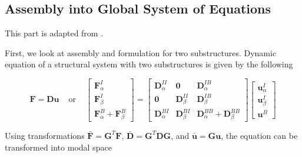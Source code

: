 \documentclass[../DomainDecomposition.tex]{subfiles}
\begin{document}
 

\subsection{Assembly into Global System of Equations} 

This part is adapted from \cite{chatterjee2021multilevel}. 
\vspace{10pt} 

First, we look at assembly and formulation for two substructures. 
Dynamic equation of a structural system with two substructures is given by the following 

\begin{equation}
    \mathbf{F} 
    =
    \mathbf{D} \mathbf{u} 
    \phantom{xx} 
    \text{or} 
    \phantom{xx} 
    \begin{bmatrix}
        \mathbf{F}_{\alpha}^{I} \\ 
        \mathbf{F}_{\beta}^{I} \\ 
        \mathbf{F}_{\alpha}^{B} + 
        \mathbf{F}_{\beta}^{B} 
    \end{bmatrix}
    =
    \begin{bmatrix}
        \mathbf{D}_{\alpha}^{II} & 
        \mathbf{0} & 
        \mathbf{D}_{\alpha}^{IB} \\ 
        \mathbf{0} & 
        \mathbf{D}_{\beta}^{II} & 
        \mathbf{D}_{\beta}^{IB} \\ 
        \mathbf{D}_{\alpha}^{BI} & 
        \mathbf{D}_{\beta}^{BI} & 
        \mathbf{D}_{\alpha}^{BB} + 
        \mathbf{D}_{\beta}^{BB} 
    \end{bmatrix}
    \begin{bmatrix}
        \mathbf{u}_{\alpha}^{I} \\ 
        \mathbf{u}_{\beta}^{I} \\ 
        \mathbf{u}^{B} 
    \end{bmatrix}
\end{equation}

Using transformations $\bar{\mathbf{F}}=\mathbf{G}^{T}\mathbf{F}$, $\bar{\mathbf{D}}=\mathbf{G}^{T}\mathbf{D}\mathbf{G}$, and $\bar{\mathbf{u}}=\mathbf{G}\mathbf{u}$, the equation can be transformed into modal space 
\end{document}
